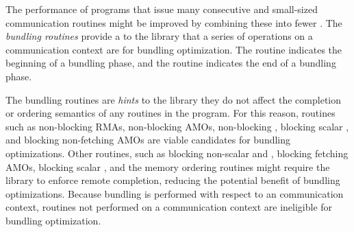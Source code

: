 The performance of \openshmem programs that issue many
consecutive and small-sized communication routines might be
improved by combining these 
 into fewer 
.
The \emph{bundling routines} provide a   to the \openshmem
library that  a series of operations on a
communication context  are  
for bundling optimization.
The  routine indicates the beginning of a bundling
phase, and the  routine indicates the end of a
bundling phase.

The bundling routines are \textit{hints} to the \openshmem library\newtext{;}\oldtext{,}
 they do not affect the completion or ordering semantics of any \openshmem
routines in the program.
For this reason, routines such as non-blocking RMAs, non-blocking AMOs,
non-blocking , blocking scalar , and blocking
non-fetching AMOs are viable candidates for bundling optimizations.
Other routines, such as blocking non-scalar  and , blocking
fetching AMOs, blocking scalar , and the memory ordering routines
might require the library to enforce remote completion, reducing the potential
benefit of bundling optimizations.
Because bundling is performed with respect to an \openshmem communication
context, routines not performed on a communication context  are ineligible for
bundling optimization.
